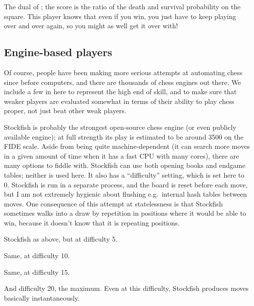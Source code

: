 \documentclass[10pt,preprint,twocolumn]{acmart}
\begin{document}
 The dual of ; the score is
the ratio of the death and survival probability on the square. This
player knows that even if you win, you just have to keep playing over
and over again, so you might as well get it over with!

\subsection{Engine-based players}

Of course, people have been making more serious attempts at automating
chess since before computers, and there are thousands of chess engines
out there. We include a few in here to represent the high end of
skill, and to make sure that weaker players are evaluated somewhat in
terms of their ability to play chess proper, not just beat other weak
players.

 Stockfish is probably the strongest
open-source chess engine (or even publicly available engine); at full
strength its play is estimated to be around 3500 on the FIDE scale.
Aside from being quite machine-dependent (it can search more moves in
a given amount of time when it has a fast CPU with many cores), there
are many options to fiddle with. Stockfish can use both opening books
and endgame tables; neither is used here. It also has a ``difficulty''
setting, which is set here to 0. Stockfish is run in a separate
process, and the board is reset before each move, but I am not
extremely hygienic about flushing e.g.~internal hash tables between
moves. One consequence of this attempt at statelessness is that
Stockfish sometimes walks into a draw by repetition in positions
where it would be able to win, because it doesn't know that it is
repeating positions.

 Stockfish as above, but at difficulty 5.

 Same, at difficulty 10.

 Same, at difficulty 15.

 And difficulty 20, the maximum. Even
at this difficulty, Stockfish produces moves basically instantaneously.
\end{document}
